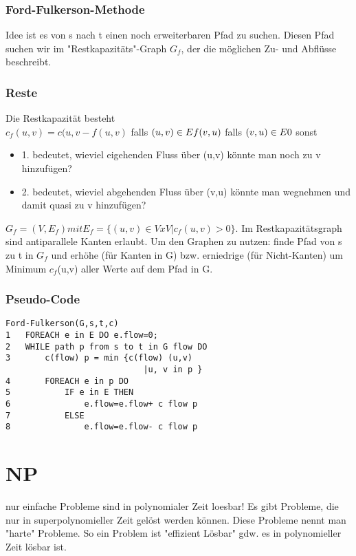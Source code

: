 \documentclass[jou,apacite]{apa6}
\begin{document}
\subsubsection{Ford-Fulkerson-Methode}
Idee ist es von s nach t einen noch erweiterbaren Pfad zu suchen. Diesen Pfad suchen wir im "Restkapazitäts"-Graph $G_f$, der die möglichen Zu- und Abflüsse beschreibt.\\

\subsubsection{Reste}
Die Restkapazität besteht \\ 
$c_f(u,v) = c(u,v - f(u,v)$ falls $(u,v) \in E \\ f(v,u)$ falls $(v,u) \in E \\ 0$ sonst \\
\begin{itemize}
    \item 1. bedeutet, wieviel eigehenden Fluss über (u,v) könnte man noch zu v hinzufügen?
    \item 2. bedeutet, wieviel abgehenden Fluss über (v,u) könnte man wegnehmen und damit quasi zu v hinzufügen?
\end{itemize}
$G_f = (V,E_f) mit E_f = \{ (u,v) \in V x V | c_f(u,v) > 0\}$. Im Restkapazitätsgraph sind antiparallele Kanten erlaubt. Um den Graphen zu nutzen: finde Pfad von s zu t in $G_f$ und erhöhe (für Kanten in G) bzw. erniedrige (für Nicht-Kanten) um Minimum $c_f$(u,v) aller Werte auf dem Pfad in G.

\subsubsection{Pseudo-Code}
\begin{lstlisting}
Ford-Fulkerson(G,s,t,c)
1   FOREACH e in E DO e.flow=0;
2   WHILE path p from s to t in G flow DO
3       c(flow) p = min {c(flow) (u,v) 
                            |u, v in p }
4       FOREACH e in p DO
5           IF e in E THEN
6               e.flow=e.flow+ c flow p
7           ELSE
8               e.flow=e.flow- c flow p
\end{lstlisting}

\section{NP}
nur einfache Probleme sind in polynomialer Zeit loesbar! Es gibt Probleme, die nur in superpolynomieller Zeit gelöst werden können. Diese Probleme nennt man "harte" Probleme. So ein Problem ist "effizient Lösbar" gdw. es in polynomieller Zeit lösbar ist. 
\end{document}
